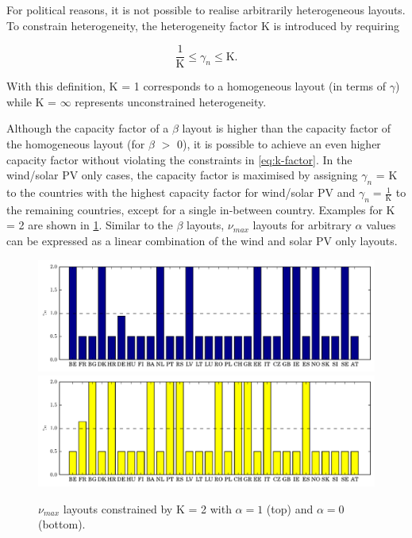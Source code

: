 \documentclass[a4paper, 12pt, sort&compress]{elsarticle}%
\newcommand{\chromowidth}{1.05 \columnwidth}
\begin{document}
For political reasons, it is not possible to realise arbitrarily
heterogeneous layouts. To constrain heterogeneity, the heterogeneity
factor K is introduced by requiring

\begin{equation}
  \label{eq:k-factor}
  \frac{1}{\text{K}} \leq \gamma_{n} \leq \text{K} .
\end{equation}

With this definition, K = 1 corresponds to a homogeneous layout (in
terms of $\gamma$) while K = $\infty$ represents unconstrained
heterogeneity.

Although the capacity factor of a $\beta$ layout is higher than the
capacity factor of the homogeneous layout (for $\beta$ $>$ 0), it is
possible to achieve an even higher capacity factor without violating
the constraints in \cref{eq:k-factor}. In the wind/solar PV only
cases, the capacity factor is maximised by assigning $\gamma_{n}$ = K to
the countries with the highest capacity factor for wind/solar PV and
$\gamma_{n} = \frac{1}{\text{K}}$ to the remaining countries, except for a
single in-between country. Examples for K = 2 are shown in
\cref{fig:max2}. Similar to the $\beta$ layouts, $\nu_{max}$ layouts for
arbitrary $\alpha$ values can be expressed as a linear combination of the
wind and solar PV only layouts.

\begin{figure}[h!]
  \centering
  \includegraphics[width = \chromowidth, center]{k=2cfMaxWind}
  \includegraphics[width = \chromowidth, center]{k=2cfMaxSolar}
  \caption{$\nu_{max}$ layouts constrained by K = 2 with $\alpha = 1$ (top) and $\alpha = 0$ (bottom).}
  \label{fig:max2}
\end{figure}
\end{document}
